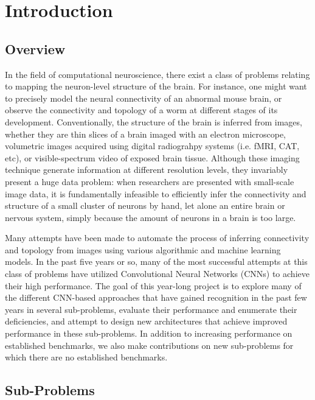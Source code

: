\chapter{Introduction}

\section{Overview}

In the field of computational neuroscience, there exist a class of problems relating to mapping the neuron-level structure of the brain. For instance, one might want to precisely model the neural connectivity of an abnormal mouse brain, or observe the connectivity and topology of a worm at different stages of its development. Conventionally, the structure of the brain is inferred from images, whether they are thin slices of a brain imaged with an electron microscope, volumetric images acquired using digital radiograhpy systems (i.e. fMRI, CAT, etc), or visible-spectrum video of exposed brain tissue. Although these imaging technique generate information at different resolution levels, they invariably present a huge data problem: when researchers are presented with small-scale image data, it is fundamentally infeasible to efficiently infer the connectivity and structure of a small cluster of neurons by hand, let alone an entire brain or nervous system, simply because the amount of neurons in a brain is too large.

Many attempts have been made to automate the process of inferring connectivity and topology from images using various algorithmic and machine learning models. In the past five years or so, many of the most successful attempts at this class of problems have utilized Convolutional Neural Networks (CNNs) to achieve their high performance. The goal of this year-long project is to explore many of the different CNN-based approaches that have gained recognition in the past few years in several sub-problems, evaluate their performance and enumerate their deficiencies, and attempt to design new architectures that achieve improved performance in these sub-problems. In addition to increasing performance on established benchmarks, we also make contributions on new sub-problems for which there are no established benchmarks.

\section{Sub-Problems}

